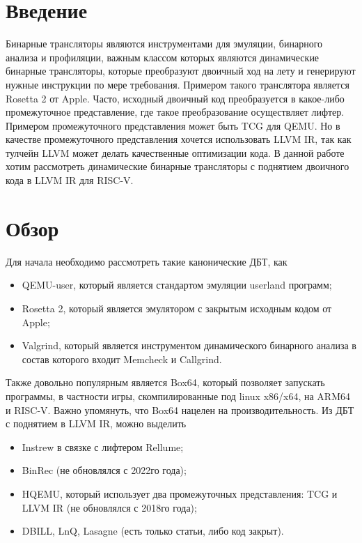 
\section{Введение}
Бинарные трансляторы являются инструментами для эмуляции, бинарного анализа и профиляции, важным классом которых являются динамические бинарные трансляторы, которые преобразуют двоичный ход на лету и генерируют нужные инструкции по мере требования. Примером такого транслятора является Rosetta 2 от Apple. Часто, исходный двоичный код преобразуется в какое-либо промежуточное представление, где такое преобразование осуществляет лифтер. Примером промежуточного представления может быть TCG для QEMU. Но в качестве промежуточного представления хочется использовать LLVM IR, так как тулчейн LLVM может делать качественные оптимизации кода. В данной работе хотим рассмотреть динамические бинарные трансляторы с поднятием двоичного кода в LLVM IR для RISC-V.
\section{Обзор}
Для начала необходимо рассмотреть такие канонические ДБТ, как
\begin{itemize}
    \item QEMU-user, который является стандартом эмуляции userland программ;
    \item Rosetta 2, который является эмулятором с закрытым исходным кодом от Apple;
    \item Valgrind, который является инструментом динамического бинарного анализа в состав которого входит Memcheck и Callgrind.
\end{itemize}

Также довольно популярным является Box64, который позволяет запускать программы, в частности игры, скомпилированные под linux x86/x64, на ARM64 и RISC-V. Важно упомянуть, что Box64 нацелен на производительность.
Из ДБТ с поднятием в LLVM IR, можно выделить
\begin{itemize}
    \item Instrew в связке с лифтером Rellume;
    \item BinRec (не обновлялся с 2022го года);
    \item HQEMU, который использует два промежуточных представления: TCG и LLVM IR (не обновлялся с 2018го года);
    \item DBILL, LnQ, Lasagne (есть только статьи, либо код закрыт).
\end{itemize}

